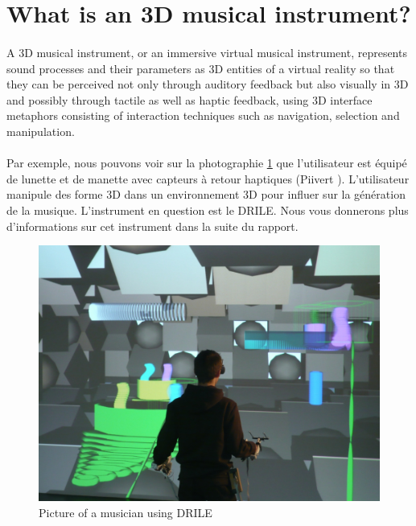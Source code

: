 \newpage
\section{What is an 3D musical instrument?}

\paragraph{}

A 3D musical instrument, or an immersive virtual musical instrument, represents sound processes and their parameters as 3D entities of a virtual reality so that they can be perceived not only through auditory feedback but also visually in 3D and possibly through tactile as well as haptic feedback, using 3D interface metaphors consisting of interaction techniques such as navigation, selection and manipulation.

\paragraph{}

Par exemple, nous pouvons voir sur la photographie \ref{drile} que l'utilisateur est équipé de lunette et de manette avec capteurs à retour haptiques (Piivert \cite{berthaut2010piivert}). L'utilisateur manipule des forme 3D dans un environnement 3D pour influer sur la génération de la musique. L'instrument en question est le DRILE. Nous vous donnerons plus d'informations sur cet instrument dans la suite du rapport.

\begin{figure}[t]
\centering
\includegraphics[scale=0.3]{image/drile.jpg}
\caption{Picture of a musician using DRILE}
\label{drile}
\end{figure}


